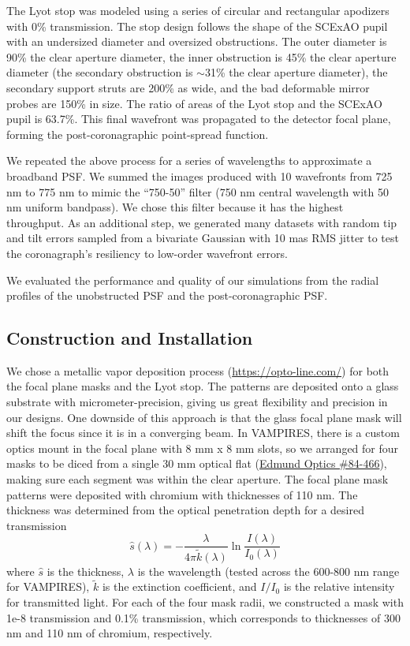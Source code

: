 \documentclass[12pt]{spieman}  %
\begin{document}
\begin{spacing}{2}
The Lyot stop was modeled using a series of circular and rectangular apodizers with 0\% transmission. The stop design follows the shape of the SCExAO pupil with an undersized diameter and oversized obstructions. The outer diameter is 90\% the clear aperture diameter, the inner obstruction is 45\% the clear aperture diameter (the secondary obstruction is $\sim$31\% the clear aperture diameter), the secondary support struts are 200\% as wide, and the bad deformable mirror probes are 150\% in size. The ratio of areas of the Lyot stop and the SCExAO pupil is 63.7\%. This final wavefront was propagated to the detector focal plane, forming the post-coronagraphic point-spread function.

We repeated the above process for a series of wavelengths to approximate a broadband PSF. We summed the images produced with 10 wavefronts from 725 nm to 775 nm to mimic the ``750-50'' filter (750 nm central wavelength with 50 nm uniform bandpass). We chose this filter because it has the highest throughput. As an additional step, we generated many datasets with random tip and tilt errors sampled from a bivariate Gaussian with 10 mas RMS jitter to test the coronagraph's resiliency to low-order wavefront errors.

We evaluated the performance and quality of our simulations from the radial profiles of the unobstructed PSF and the post-coronagraphic PSF.

\subsection{Construction and Installation}\label{sec:install}

We chose a metallic vapor deposition process (\url{https://opto-line.com/}) for both the focal plane masks and the Lyot stop. The patterns are deposited onto a glass substrate with micrometer-precision, giving us great flexibility and precision in our designs. One downside of this approach is that the glass focal plane mask will shift the focus since it is in a converging beam. In VAMPIRES, there is a custom optics mount in the focal plane with 8 mm x 8 mm slots, so we arranged for four masks to be diced from a single 30 mm optical flat (\href{https://www.edmundoptics.com/p/30mm-dia-4mm-thick-nir-i-coated-lambda10-fused-silica-window/27562/}{Edmund Optics \#84-466}), making sure each segment was within the clear aperture. The focal plane mask patterns were deposited with chromium with thicknesses of 110 nm. The thickness was determined from the optical penetration depth for a desired transmission
\begin{equation}
    \hat{s}(\lambda) = -\frac{\lambda}{4\pi\tilde{k}(\lambda)}\ln{\frac{I(\lambda)}{I_0(\lambda)}}
    \label{eqn:throughput}
\end{equation}
where $\hat{s}$ is the thickness, $\lambda$ is the wavelength (tested across the 600-800 nm range for VAMPIRES), $\tilde{k}$ is the extinction coefficient, and $I/I_0$ is the relative intensity for transmitted light. For each of the four mask radii, we constructed a mask with 1e-8 transmission and 0.1\% transmission, which corresponds to thicknesses of 300 nm and 110 nm of chromium, respectively.


\end{spacing}
\end{document}
